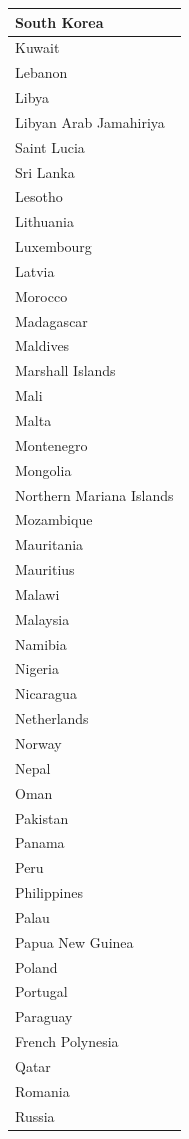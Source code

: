 \documentclass[]{article}
\begin{document}
\begin{table}
\begin{tabular}[t]{l}
\hline
South Korea\\
\hline
Kuwait\\
\hline
Lebanon\\
\hline
Libya\\
\hline
Libyan Arab Jamahiriya\\
\hline
Saint Lucia\\
\hline
Sri Lanka\\
\hline
Lesotho\\
\hline
Lithuania\\
\hline
Luxembourg\\
\hline
Latvia\\
\hline
Morocco\\
\hline
Madagascar\\
\hline
Maldives\\
\hline
Marshall Islands\\
\hline
Mali\\
\hline
Malta\\
\hline
Montenegro\\
\hline
Mongolia\\
\hline
Northern Mariana Islands\\
\hline
Mozambique\\
\hline
Mauritania\\
\hline
Mauritius\\
\hline
Malawi\\
\hline
Malaysia\\
\hline
Namibia\\
\hline
Nigeria\\
\hline
Nicaragua\\
\hline
Netherlands\\
\hline
Norway\\
\hline
Nepal\\
\hline
Oman\\
\hline
Pakistan\\
\hline
Panama\\
\hline
Peru\\
\hline
Philippines\\
\hline
Palau\\
\hline
Papua New Guinea\\
\hline
Poland\\
\hline
Portugal\\
\hline
Paraguay\\
\hline
French Polynesia\\
\hline
Qatar\\
\hline
Romania\\
\hline
Russia\\

\end{tabular}
\end{table}
\end{document}
